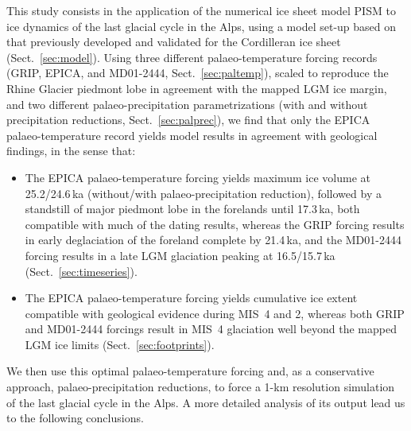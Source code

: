 \documentclass[tc, manuscript]{copernicus}
\begin{document}
\conclusions

    This study consists in the application of the numerical ice sheet model
    PISM to ice dynamics of the last glacial cycle in the Alps, using a model
    set-up based on that previously developed and validated for the Cordilleran
    ice sheet (Sect.~\ref{sec:model}).
    Using three different palaeo-temperature forcing records (GRIP, EPICA, and
    MD01-2444, Sect.~\ref{sec:paltemp}), scaled to reproduce the Rhine Glacier
    piedmont lobe in agreement with the mapped LGM ice margin, and two
    different palaeo-precipitation parametrizations (with and without
    precipitation reductions, Sect.~\ref{sec:palprec}), we find that only the
    EPICA palaeo-temperature record yields model results in agreement with
    geological findings, in the sense that:

    \begin{itemize}
      \item The EPICA palaeo-temperature forcing yields maximum ice volume at
            25.2/24.6\,ka (without/with palaeo-precipitation reduction),
            followed by a standstill of major piedmont lobe in the forelands
            until 17.3\,ka, both compatible with much of the dating results,
            whereas the GRIP forcing results in early deglaciation of the
            foreland complete by 21.4\,ka, and the MD01-2444 forcing results in
            a late LGM glaciation peaking at 16.5/15.7\,ka
            (Sect.~\ref{sec:timeseries}).
      \item The EPICA palaeo-temperature forcing yields cumulative ice extent
            compatible with geological evidence during MIS~4 and 2, whereas
            both GRIP and MD01-2444 forcings result in MIS~4 glaciation well
            beyond the mapped LGM ice limits (Sect.~\ref{sec:footprints}).
    \end{itemize}

    We then use this optimal palaeo-temperature forcing and, as a conservative
    approach, palaeo-precipitation reductions, to force a 1-km resolution
    simulation of the last glacial cycle in the Alps. A more detailed analysis
    of its output lead us to the following conclusions.
\end{document}
